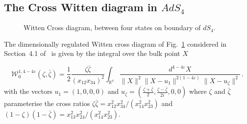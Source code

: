 \documentclass[a4paper,12pt]{article}
\numberwithin{equation}{section}
\numberwithin{figure}{section}
\begin{document}
\subsection{The Cross Witten diagram in $AdS_4$}\label{sec:WittenCross}
 \begin{figure}[ht]
                \centering
                \caption{Witten Cross diagram, between four states on
                  boundary of $dS_4$. }
                \label{fig:cross}
        \end{figure}


The dimensionally regulated Witten cross diagram of Fig.~\ref{fig:cross} considered in
Section~4.1 of~\cite{Heckelbacher:2022fbx} is given by the integral
over the bulk point $X$

\begin{equation}
       \mathcal{ W}_0^{1,4-4\varepsilon}(\zeta,\bar\zeta)=\frac12\frac{\zeta\bar\zeta}{(x_{12}x_{34})^2}\int_{\mathbb{R}^4}\frac{d^{4-4\varepsilon}X}{\|X\|^2\|X-u_1\|^{2(1-4\varepsilon)}\|X-u_{\zeta}\|^2}\,.
\end{equation}
with the vectors  $u_1=(1,0,0,0)$ and 
$u_{\zeta}=\left(\frac{\zeta+\bar\zeta}{2},\frac{\zeta-\bar\zeta}{2i},0,0\right)$ where $\zeta$  and $\bar\zeta$ parameterise the cross ratios $\zeta\bar\zeta=x_{12}^2x_{34}^2/(x_{14}^2x_{23}^2)$ and
  $(1-\zeta)(1-\bar\zeta)=x_{13}^2x_{24}^2 /(x_{14}^2 x_{23}^2)$.
\end{document}
